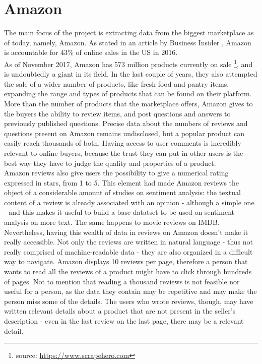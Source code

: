\documentclass[LaM,oneside,binding=0.6cm]{sapthesis}
\begin{document}
\section{Amazon}

The main focus of the project is extracting data from the biggest marketplace as of today, namely, Amazon. As stated in an article by Business Insider \parencite{intelligence_amazon_nodate}, Amazon is accountable for 43\% of online sales in the US in 2016. \\

As of November 2017, Amazon has 573 million products currently on sale \footnote{source: \url{https://www.scrapehero.com}}, and is undoubtedly a giant in its field. In the last couple of years, they also attempted the sale of a wider number of products, like fresh food and pantry items, expanding the range and types of products that can be found on their platform. \\

More than the number of products that the marketplace offers, Amazon gives to the buyers the ability to review items, and post questions and answers to previously published questions. Precise data about the numbers of reviews and questions present on Amazon remains undisclosed, but a popular product can easily reach thousands of both. Having access to user comments is incredibly relevant to online buyers, because the trust they can put in other users is the best way they have to judge the quality and properties of a product. \\

Amazon reviews also give users the possibility to give a numerical rating expressed in stars, from 1 to 5. This element had made Amazon reviews the object of a considerable amount of studies on sentiment analysis: the textual content of a review is already associated with an opinion - although a simple one - and this makes it useful to build a base datatset to be used on sentiment analysis on more text. The same happens to movie reviews on IMDB. \\

Nevertheless, having this wealth of data in reviews on Amazon doesn't make it really accessible. Not only the reviews are written in natural language - thus not really comprised of machine-readable data - they are also organized in a difficult way to navigate. Amazon displays 10 reviews per page, therefore a person that wants to read all the reviews of a product might have to click through hundreds of pages. Not to mention that reading a thousand reviews is not feasible nor useful for a person, as the data they contain may be repetitive and may make the person miss some of the details. The users who wrote reviews, though, may have written relevant details about a product that are not present in the seller's description - even in the last review on the last page, there may be a relevant detail. 
\end{document}
